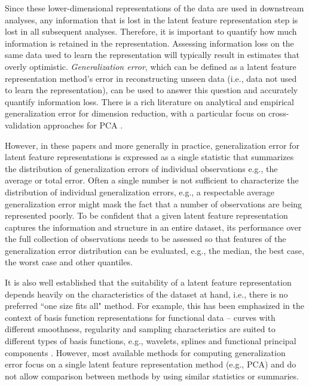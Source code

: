 Since these lower-dimensional representations of the data are used in downstream analyses, any information that is lost in the latent feature representation step is lost in all subsequent analyses. 
Therefore, it is important to quantify how much information is retained in the representation. 
Assessing information loss on the same data used to learn the representation will typically result in estimates that overly optimistic.
\emph{Generalization error}, which can be defined as a latent feature representation method's error in reconstructing unseen data (i.e., data not used to learn the representation), can be used to answer this question and accurately quantify information loss. 
There is a rich literature on analytical and empirical generalization error for dimension reduction, with a particular focus on cross-validation approaches for PCA \parencite[see, e.g.,][]{becht_dimensionality_2019, wold_cross-validatory_1978, eastment_cross-validatory_1982,krzanowski_cross-validation_1987, minka_automatic_2000, rajan_bayesian_1994, camacho_cross-validation_2014, diana_cross-validation_2002, hubert_fast_2007, josse_selecting_2012, saccenti_use_2015}.

However, in these papers and more generally in practice, generalization error for latent feature representations is expressed as a single statistic that summarizes the distribution of generalization errors of individual observations e.g., the average or total error.
Often a single number is not sufficient to characterize the distribution of individual generalization errors, e.g., a respectable average generalization error might mask the fact that a number of observations are being represented poorly. 
To be confident that a given latent feature representation captures the information and structure in an entire dataset, its performance over the full collection of observations needs to be assessed so that features of the generalization error distribution can be evaluated, e.g., the median, the best case, the worst case and other quantiles.

It is also well established that the suitability of a latent feature representation depends heavily on the characteristics of the dataset at hand, i.e., there is no preferred ``one size fits all" method.
For example, this has been emphasized in the context of basis function representations for functional data -- curves with different smoothness, regularity and sampling characteristics are suited to different types of basis functions, e.g., wavelets, splines and functional principal components \textcite[Section 3, pp. 325--328]{morris_functional_2015}.
However, most available methods for computing generalization error focus on a single latent feature representation method (e.g., PCA) and do not allow comparison between methods by using similar statistics or summaries.

